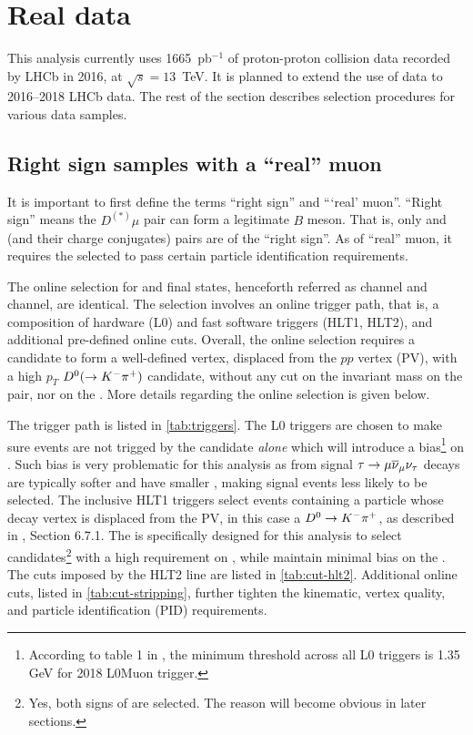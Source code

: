 \section{Real data}
\label{ref:sel:data}

This analysis currently uses 1665~pb$^{-1}$ of proton-proton collision data
recorded by LHCb in 2016, at $\sqrt{s} = 13$~TeV.
It is planned to extend the use of data to 2016--2018 LHCb data.
The rest of the section describes selection procedures for various data samples.


\subsection{Right sign samples with a ``real'' muon}
\label{ref:sel:data:rs}

It is important to first define the terms ``right sign'' and ```real' muon''.
``Right sign'' means the $D^{(*)} \mu$ pair can form a legitimate $B$ meson.
That is, only \Dz\mun and \Dstarp\mun (and their charge conjugates) pairs are
of the ``right sign''.
As of ``real'' muon, it requires the selected \muon to pass certain particle
identification requirements.

The online selection for \Dz\mun and \Dstarp\mun final states,
henceforth referred as \Dz channel and \Dstar channel,
are identical.
The selection involves an online trigger path,
that is,
a composition of hardware (L0) and fast software triggers (HLT1, HLT2),
and additional pre-defined online cuts.
Overall, the online selection requires a \muon candidate to form
a well-defined vertex,
displaced from the $pp$ vertex (PV),
with a high $p_T$ ${{D}^0} (\rightarrow {\ensuremath{{K}^-}} {\ensuremath{{\pi}^+}})$ candidate, without any cut on the
invariant mass on the \Dz\mupm pair, nor on the \muon \pt.
More details regarding the online selection is given below.

The trigger path is listed in \cref{tab:triggers}.
The L0 triggers are chosen to make sure events are not trigged by
the \muon candidate \emph{alone} which will introduce a \pt bias\footnote{
    According to table 1 in \cite{LHCb-DP-2019-001},
    the minimum \pt threshold across all L0 triggers is 1.35 GeV for 2018
    L0Muon trigger.
} on \muon.
Such bias is very problematic for this analysis as \muon from signal
${\tau} \rightarrow {\ensuremath{\mu}} {\ensuremath{{\overline{\nu}}_\mu}} {\ensuremath{{\nu}_\tau}}$ decays are typically softer and
have smaller \pt,
making signal events less likely to be selected.
The inclusive HLT1 triggers select events containing a particle whose decay
vertex is displaced from the PV,
in this case a ${{D}^0} \rightarrow {\ensuremath{{K}^-}} {\ensuremath{{\pi}^+}}$,
as described in \cite{LHCb-INT-2019-025}, Section 6.7.1.
The  is specifically designed for this analysis
to select \Dz\mupm candidates\footnote{
    Yes, both signs of \muon are selected.
    The reason will become obvious in later sections.
} with a high \pt requirement on \Dz,
while maintain minimal \pt bias on the \mupm.
The cuts imposed by the HLT2 line are listed in \cref{tab:cut-hlt2}.
Additional online cuts,
listed in \cref{tab:cut-stripping},
further tighten the kinematic, vertex quality, and particle identification (PID)
requirements.

